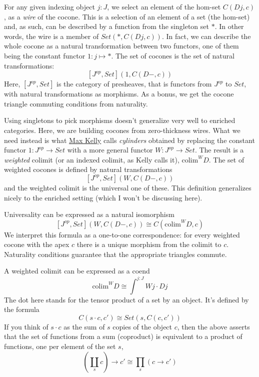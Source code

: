 \documentclass[11pt]{amsart}
\begin{document}
\begin{figure}[H]
\end{figure}
For any given indexing object $j \colon J$, we select an element of the hom-set $C(D j, c)$, as a \emph{wire} of the cocone. This is a selection of an element of a set (the hom-set) and, as such, can be described by a function from the singleton set $*$. In other words, the wire is a member of $Set(*, C(D j, c))$. In fact, we can describe the whole cocone as a natural transformation between two functors, one of them being the constant functor $1 \colon j \mapsto *$. The set of cocones is the set of natural transformations:
\[ [J^{op}, Set](1, C(D -, c))\]
Here, $[J^{op}, Set]$ is the category of presheaves, that is functors from $J^{op}$ to $Set$, with natural transformations as morphisms. As a bonus, we get the cocone triangle commuting conditions from naturality. 

Using singletons to pick morphisms doesn't generalize very well to enriched categories. Here, we are building cocones from zero-thickness wires. What we need instead is what \href{http://www.tac.mta.ca/tac/reprints/articles/10/tr10.pdf}{Max Kelly} calls \emph{cylinders} obtained by replacing the constant functor $1\colon J^{op} \to Set$ with a more general functor $W \colon J^{op} \to Set$. The result is a \emph{weighted} colimit (or an indexed colimit, as Kelly calls it), $\mbox{colim}^W D$. The set of weighted cocones is defined by natural transformations
\[ [J^{op}, Set](W, C(D -, c))\]
and the weighted colimit is the universal one of these. This definition generalizes nicely to the enriched setting (which I won't be discussing here). 

Universality can be expressed as a natural isomorphism
\[[J^{op}, Set](W, C(D -, c))  \cong  C(\mbox{colim}^W D, c)\]
We interpret this formula as a one-to-one correspondence: for every weighted cocone with the apex $c$ there is a unique morphism from the colimit to $c$. Naturality conditions guarantee that the appropriate triangles commute.

A weighted colimit can be expressed as a coend
\[\mbox{colim}^W D \cong \int^{j \colon J} W j \cdot D j\]
The dot here stands for the tensor product of a set by an object. It's defined by the formula
\[C(s \cdot c, c') \cong Set(s, C(c, c'))\]
If you think of $s \cdot c$ as the sum of $s$ copies of the object $c$, then the above asserts that the set of functions from a sum (coproduct) is equivalent to a product of functions, one per element of the set $s$,
\[(\coprod_s c) \to c' \cong \prod_s (c \to c')\]
 
\end{document}
